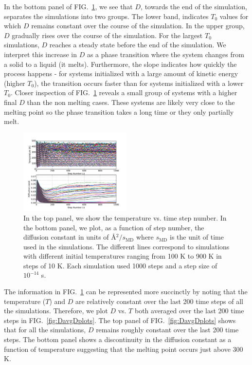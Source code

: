 \documentclass[10pt,showpacs,preprintnumbers,footinbib,amsmath,amssymb,aps,prl,twocolumn,groupedaddress,superscriptaddress,showkeys]{revtex4-1}
\newcommand{\pwrten}[1]{%
	\ensuremath{10^{#1}} }
\begin{document}
In the bottom panel of FIG.~\ref{fig:TDplot},
we see that $D$, towards the end of the simulation, separates the
simulations into two groups.
The lower band, indicates $T_0$ values for which $D$ remains constant
over the course of the simulation. In the upper group, $D$ gradually rises
over the course of the simulation. For the largest $T_0$ simulations,
$D$ reaches a steady state before the end of the simulation. We
interpret this increase in $D$ as a phase transition where the system
changes from a solid to a liquid (it melts). Furthermore, the slope
indicates how quickly the process happens - for systems initialized
with a large amount of kinetic energy (higher $T_0$), the transition
occurs faster than for systems initialized with a lower $T_0$. Closer
inspection of FIG.~\ref{fig:TDplot} reveals a small group of systems
with a higher final $D$ than the non melting cases. These systems
are likely very close to the melting point so the phase transition
takes a long time or they only partially melt.

\begin{figure}
\centering
	\includegraphics[width=0.5\textwidth]{figures/TDplot.pdf}
	\caption{In the top panel, we show the temperature vs. time
	step number. In the bottom panel, we plot, as a function of
	step number, the diffusion
	constant in units of {\AA}$^2 / s_{\mathrm{MD}}$ where
	$s_{\mathrm{MD}}$ is the unit of time used in the simulations.
	The different lines correspond to simulations with different
	initial temperatures ranging from 100 K to 900 K in steps of
	10 K. Each simulation used 1000 steps and a step size of
	\pwrten{-14} s.}
	\label{fig:TDplot}
\end{figure}

The information in FIG.~\ref{fig:TDplot} can be represented more
succinctly by noting that the temperature ($T$) and $D$ are relatively
constant over the last 200 time steps of all the simulations. Therefore,
we plot $D$ vs. $T$ both averaged over the last 200 time steps in
FIG.~\ref{fig:DavgDplots}. The top panel of FIG.~\ref{fig:DavgDplots}
shows that for all the simulations, $D$ remains roughly constant over
the last 200 time steps. The bottom panel shows a discontinuity in the
diffusion constant as a function of temperature suggesting that the
melting point occurs just above 300 K.
\end{document}
